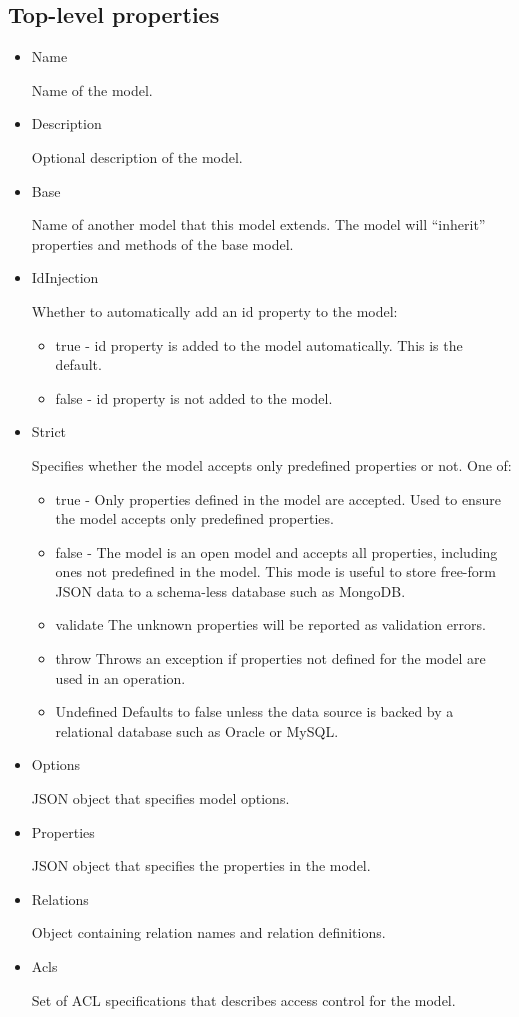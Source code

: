 \subsection{Top-level properties}
\begin{itemize}
\item Name

Name of the model.

\item Description

Optional description of the model.

\item Base

Name of another model that this model extends. The model will ``inherit'' properties and methods of the base model.

\item IdInjection

Whether to automatically add an id property to the model:
\begin{itemize}
\item true - id property is added to the model automatically. This is the default.
\item false - id property is not added to the model.
\end{itemize}

\item Strict

Specifies whether the model accepts only predefined properties or not. One of:
\begin{itemize}
\item true - Only properties defined in the model are accepted. Used to ensure the model accepts only predefined properties.
\item false - The model is an open model and accepts all properties, including ones not predefined in the model. This mode is useful to store free-form JSON data to a schema-less database such as MongoDB.
\item validate The unknown properties will be reported as validation errors.
\item throw Throws an exception if properties not defined for the model are used in an operation.
\item Undefined Defaults to false unless the data source is backed by a relational database such as Oracle or MySQL.
\end{itemize}

\item Options

JSON object that specifies model options.

\item Properties

JSON object that specifies the properties in the model.

\item Relations

Object containing relation names and relation definitions.

\item Acls

Set of ACL specifications that describes access control for the model.

\end{itemize}

